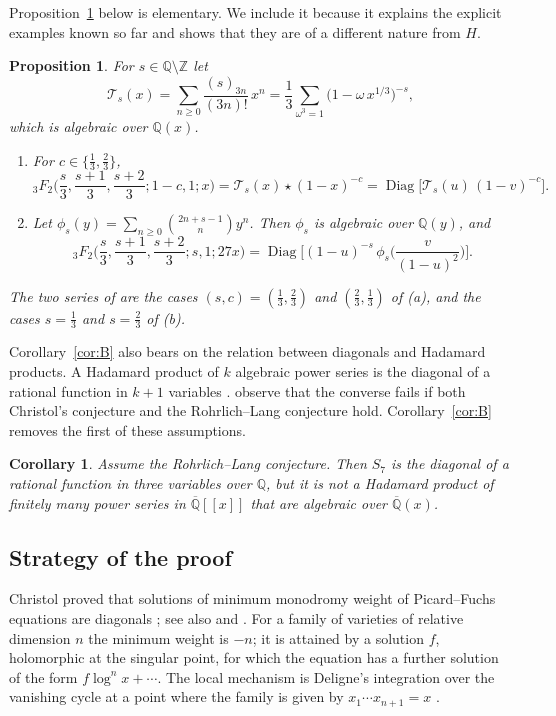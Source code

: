 \documentclass[11pt]{amsart}
\newtheorem{maincor}[mainthm]{Corollary}
\newtheorem{mainprop}[mainthm]{Proposition}
\theoremstyle{definition}
\theoremstyle{remark}
\numberwithin{equation}{section}
\newcommand{\Q}{\mathbb{Q}}
\newcommand{\Z}{\mathbb{Z}}
\newcommand{\Qb}{\overline{\mathbb{Q}}}
\newcommand{\cT}{\mathcal{T}}
\DeclareMathOperator{\Diag}{Diag}
\begin{document}
Proposition~\ref{prop:D} below is elementary. We include it because it explains the explicit examples known so far and shows that they are of a different nature from $H$.

\begin{mainprop}\label{prop:D}
For $s\in\Q\setminus\Z$ let
\[
\cT_s(x)=\sum_{n\ge0}\frac{(s)_{3n}}{(3n)!}\,x^n=\frac13\sum_{\omega^3=1}\big(1-\omega\,x^{1/3}\big)^{-s},
\]
which is algebraic over $\Q(x)$.
\begin{enumerate}[label=\textup{(\alph*)},leftmargin=2em]
\item For $c\in\{\frac13,\frac23\}$,
\[
{}_3F_2\Big(\frac s3,\frac{s+1}3,\frac{s+2}3;1-c,1;x\Big)=\cT_s(x)\star(1-x)^{-c}=\Diag\big[\cT_s(u)\,(1-v)^{-c}\big].
\]
\item Let $\phi_s(y)=\sum_{n\ge0}\binom{2n+s-1}{n}y^n$. Then $\phi_s$ is algebraic over $\Q(y)$, and
\[
{}_3F_2\Big(\frac s3,\frac{s+1}3,\frac{s+2}3;s,1;27x\Big)=\Diag\Big[(1-u)^{-s}\,\phi_s\Big(\frac{v}{(1-u)^2}\Big)\Big].
\]
\end{enumerate}
The two series of \citet{AbdelazizKoutschanMaillard2020} are the cases $(s,c)=(\frac13,\frac23)$ and $(\frac23,\frac13)$ of \textup{(a)}, and the cases $s=\frac13$ and $s=\frac23$ of \textup{(b)}.
\end{mainprop}

Corollary~\ref{cor:B} also bears on the relation between diagonals and Hadamard products. A Hadamard product of $k$ algebraic power series is the diagonal of a rational function in $k+1$ variables \citep[Proposition~4.1]{HarderKramerMiller2025}. \citet[Remark~4.2]{HarderKramerMiller2025} observe that the converse fails if both Christol's conjecture and the Rohrlich--Lang conjecture hold. Corollary~\ref{cor:B} removes the first of these assumptions.

\begin{maincor}\label{cor:E}
Assume the Rohrlich--Lang conjecture. Then $S_7$ is the diagonal of a rational function in three variables over $\Q$, but it is not a Hadamard product of finitely many power series in $\Qb[[x]]$ that are algebraic over $\Qb(x)$.
\end{maincor}

\subsection{Strategy of the proof}
Christol proved that solutions of minimum monodromy weight of Picard--Fuchs equations are diagonals \citep[Theorem~12]{Christol1990}; see also \citet{Christol1985} and \citet[\S4.2, Corollary~30]{Christol2015}. For a family of varieties of relative dimension $n$ the minimum weight is $-n$; it is attained by a solution $f$, holomorphic at the singular point, for which the equation has a further solution of the form $f\log^nx+\cdots$. The local mechanism is Deligne's integration over the vanishing cycle at a point where the family is given by $x_1\cdots x_{n+1}=x$ \citep{Deligne1984}.
\end{document}

